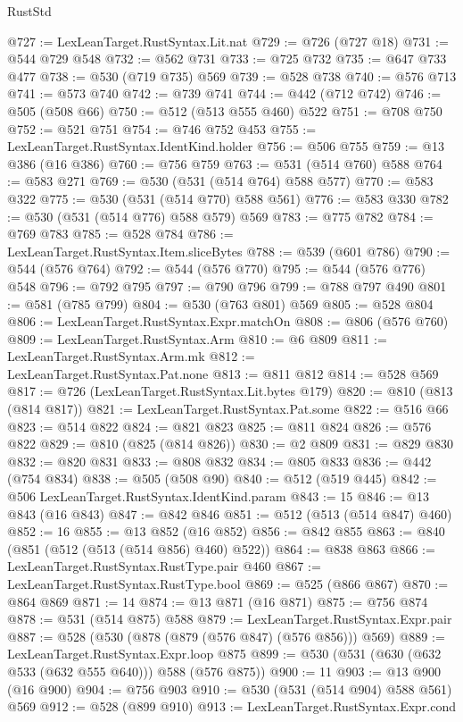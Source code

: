\begin{lexlean}{RustStd}
\begin{coremodule}
{\begin{coremodule}
{{{{{{{{{{{{{{@727 := LexLeanTarget.RustSyntax.Lit.nat
@729 := @726 (@727 @18)
@731 := @544 @729 @548
@732 := @562 @731
@733 := @725 @732
@735 := @647 @733 @477
@738 := @530 (@719 @735) @569
@739 := @528 @738
@740 := @576 @713
@741 := @573 @740
@742 := @739 @741
@744 := @442 (@712 @742)
@746 := @505 (@508 @66)
@750 := @512 (@513 @555 @460) @522
@751 := @708 @750
@752 := @521 @751
@754 := @746 @752 @453
@755 := LexLeanTarget.RustSyntax.IdentKind.holder
@756 := @506 @755
@759 := @13 @386 (@16 @386)
@760 := @756 @759
@763 := @531 (@514 @760) @588
@764 := @583 @271
@769 := @530 (@531 (@514 @764) @588 @577)
@770 := @583 @322
@775 := @530 (@531 (@514 @770) @588 @561)
@776 := @583 @330
@782 := @530 (@531 (@514 @776) @588 @579) @569
@783 := @775 @782
@784 := @769 @783
@785 := @528 @784
@786 := LexLeanTarget.RustSyntax.Item.sliceBytes
@788 := @539 (@601 @786)
@790 := @544 (@576 @764)
@792 := @544 (@576 @770)
@795 := @544 (@576 @776) @548
@796 := @792 @795
@797 := @790 @796
@799 := @788 @797 @490
@801 := @581 (@785 @799)
@804 := @530 (@763 @801) @569
@805 := @528 @804
@806 := LexLeanTarget.RustSyntax.Expr.matchOn
@808 := @806 (@576 @760)
@809 := LexLeanTarget.RustSyntax.Arm
@810 := @6 @809
@811 := LexLeanTarget.RustSyntax.Arm.mk
@812 := LexLeanTarget.RustSyntax.Pat.none
@813 := @811 @812
@814 := @528 @569
@817 := @726 (LexLeanTarget.RustSyntax.Lit.bytes @179)
@820 := @810 (@813 (@814 @817))
@821 := LexLeanTarget.RustSyntax.Pat.some
@822 := @516 @66
@823 := @514 @822
@824 := @821 @823
@825 := @811 @824
@826 := @576 @822
@829 := @810 (@825 (@814 @826))
@830 := @2 @809
@831 := @829 @830
@832 := @820 @831
@833 := @808 @832
@834 := @805 @833
@836 := @442 (@754 @834)
@838 := @505 (@508 @90)
@840 := @512 (@519 @445)
@842 := @506 LexLeanTarget.RustSyntax.IdentKind.param
@843 := 15
@846 := @13 @843 (@16 @843)
@847 := @842 @846
@851 := @512 (@513 (@514 @847) @460)
@852 := 16
@855 := @13 @852 (@16 @852)
@856 := @842 @855
@863 := @840 (@851 (@512 (@513 (@514 @856) @460) @522))
@864 := @838 @863
@866 := LexLeanTarget.RustSyntax.RustType.pair @460
@867 := LexLeanTarget.RustSyntax.RustType.bool
@869 := @525 (@866 @867)
@870 := @864 @869
@871 := 14
@874 := @13 @871 (@16 @871)
@875 := @756 @874
@878 := @531 (@514 @875) @588
@879 := LexLeanTarget.RustSyntax.Expr.pair
@887 := @528 (@530 (@878 (@879 (@576 @847) (@576 @856))) @569)
@889 := LexLeanTarget.RustSyntax.Expr.loop @875
@899 := @530 (@531 (@630 (@632 @533 (@632 @555 @640))) @588 (@576 @875))
@900 := 11
@903 := @13 @900 (@16 @900)
@904 := @756 @903
@910 := @530 (@531 (@514 @904) @588 @561) @569
@912 := @528 (@899 @910)
@913 := LexLeanTarget.RustSyntax.Expr.cond
}}}}}}}}}}}}}}
\end{coremodule}}
\end{coremodule}
\end{lexlean}
